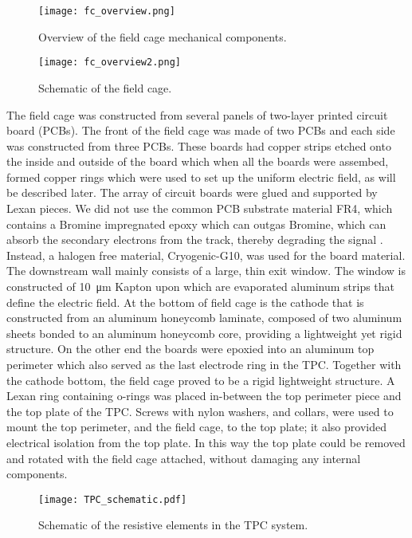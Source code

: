 \begin{figure}[!htb]
\centering
\texttt{[image: fc\_overview.png]}
\label{fig:fc_overview}
\caption{Overview of the field cage mechanical components.}
\end{figure}


\begin{figure}[!htb]
\texttt{[image: fc\_overview2.png]}
\label{fig:fc_overview2}
\caption{Schematic of the field cage.}
\end{figure}


The field cage was constructed from several panels of two-layer printed circuit board (PCBs). The front of the field cage was made of two PCBs and each side was constructed from three PCBs. These boards had copper strips etched onto the inside and outside of the board which when all the boards were assembed, formed copper rings which were used to set up the uniform electric field, as will be described later. The array of circuit boards were glued and supported by Lexan pieces. We did not use the common PCB substrate material FR4, which contains a Bromine impregnated epoxy which can outgas Bromine, which can absorb the secondary electrons from the track, thereby degrading the signal \cite{tpcAging}. Instead, a halogen free material, Cryogenic-G10, was used for the board material.  The downstream wall mainly consists of a large, thin exit window. The window  is constructed of   \SI{10}{\micro\metre} Kapton upon which are  evaporated aluminum strips that define the electric field. At the bottom of field cage is the cathode that is  constructed from an aluminum honeycomb laminate, composed of two aluminum sheets bonded to an aluminum honeycomb core, providing a lightweight yet rigid structure. On the other end the boards were epoxied into an aluminum top perimeter which also served as the last electrode ring in the TPC. Together with the cathode bottom, the field cage proved to be a rigid lightweight structure. A Lexan ring containing o-rings was placed in-between the top perimeter piece and the top plate of the TPC. Screws with nylon washers, and collars, were used to mount the top perimeter, and the field cage, to the top plate; it also provided electrical isolation from the top plate. In this way the top plate could be removed and rotated with the field cage attached, without damaging any internal components. 

\begin{figure}[!htb]
\centering
\texttt{[image: TPC\_schematic.pdf]}
\caption{Schematic of the resistive elements in the TPC system.}
\label{fig:TPC_schematic}
\end{figure}



